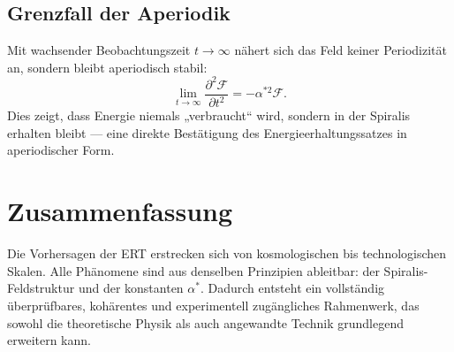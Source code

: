 \subsection{Grenzfall der Aperiodik}
Mit wachsender Beobachtungszeit \(t \rightarrow \infty\) nähert sich das Feld keiner Periodizität an, 
sondern bleibt aperiodisch stabil:
\[
\lim_{t \to \infty} \frac{\partial^2 \mathcal{F}}{\partial t^2} = -\alpha^{*2} \mathcal{F}.
\]
Dies zeigt, dass Energie niemals „verbraucht“ wird, sondern in der Spiralis erhalten bleibt — 
eine direkte Bestätigung des Energieerhaltungssatzes in aperiodischer Form.

\section{Zusammenfassung}
\label{sec:zusammenfassung8}
Die Vorhersagen der ERT erstrecken sich von kosmologischen bis technologischen Skalen. 
Alle Phänomene sind aus denselben Prinzipien ableitbar: der Spiralis-Feldstruktur und der konstanten \(\alpha^*\). 
Dadurch entsteht ein vollständig überprüfbares, kohärentes und experimentell zugängliches Rahmenwerk, 
das sowohl die theoretische Physik als auch angewandte Technik grundlegend erweitern kann.
